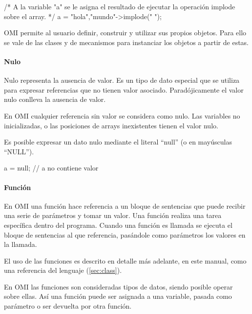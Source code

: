 \begin{myverbatim}
   /*
      A la variable "a" se le asigna
      el resultado de ejecutar la operación 
      implode sobre el array. 
   */
   a = {"hola","mundo"}->implode(" ");
\end{myverbatim} 

OMI permite al usuario definir, construir y utilizar sus propios objetos. Para ello se vale de las clases
y de mecanismos para instanciar los objetos a partir de estas.


\paragraph{Nulo}
Nulo representa la ausencia de valor. Es un tipo de dato especial que se utiliza para expresar referencias que no tienen valor asociado. Paradójicamente el
valor nulo conlleva la ausencia de valor. 

En OMI cualquier referencia sin valor se considera como nulo. Las variables no inicializadas, o las posiciones de arrays inexistentes tienen el valor nulo. 

Es posible expresar un dato nulo mediante el literal ``null'' (o en mayúsculas ``NULL''). \\

\begin{myverbatim}
   a = null; // a no contiene valor
\end{myverbatim} 

\paragraph{Función}\label{sec:type_func}
En OMI una función hace referencia a un bloque de sentencias que puede recibir una serie de parámetros y tomar un valor. Una función realiza una tarea específica dentro del programa.
Cuando una función es llamada se ejecuta el bloque de sentencias al que referencia, pasándole como parámetros los valores en la llamada. 

El uso de las funciones es descrito en detalle más adelante, en este manual, como una referencia del lenguaje (\autoref{sec:class}). 

En OMI las funciones son consideradas tipos de datos, siendo posible operar sobre ellas. Así una función puede ser asignada a una variable, pasada como parámetro 
o ser devuelta por otra función. \\

